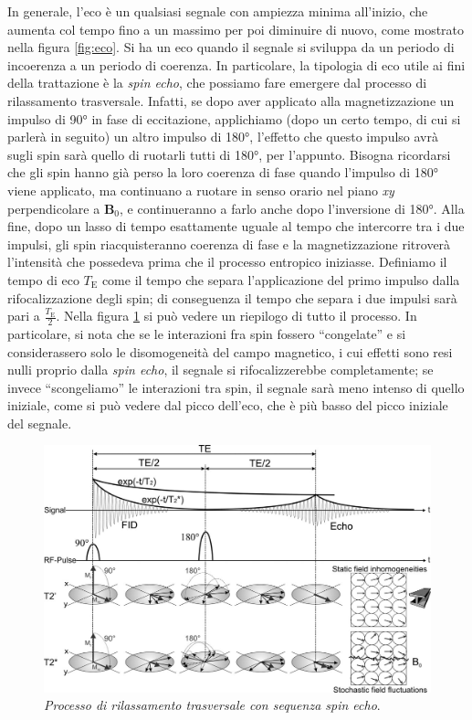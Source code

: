 \documentclass{report}
\newcommand{\virgolette}[1]{``#1''}
\newcommand{\figref}[1]{figura \ref{#1}}
\numberwithin{equation}{section}
\numberwithin{figure}{section}
\renewcommand{\Vec}{\bm}
\begin{document}
\noindent In generale, l'eco è un qualsiasi segnale con ampiezza minima all'inizio, che aumenta col tempo fino a un massimo per poi diminuire di nuovo, come mostrato nella \figref{fig:eco}. Si ha un eco quando il segnale si sviluppa da un periodo di incoerenza a un periodo di coerenza. In particolare, la tipologia di eco utile ai fini della trattazione è la \textit{spin echo}, che possiamo fare emergere dal processo di rilassamento trasversale. Infatti, se dopo aver applicato alla magnetizzazione un impulso di 90° in fase di eccitazione, applichiamo (dopo un certo tempo, di cui si parlerà in seguito) un altro impulso di 180°, l'effetto che questo impulso avrà sugli spin sarà quello di ruotarli tutti di 180°, per l'appunto. Bisogna ricordarsi che gli spin hanno già perso la loro coerenza di fase quando l'impulso di 180° viene applicato, ma continuano a ruotare in senso orario nel piano \textit{xy} perpendicolare a $\Vec{B}_0$, e continueranno a farlo anche dopo l'inversione di 180°. Alla fine, dopo un lasso di tempo esattamente uguale al tempo che intercorre tra i due impulsi, gli spin riacquisteranno coerenza di fase e la magnetizzazione ritroverà l'intensità che possedeva prima che il processo entropico iniziasse. Definiamo il tempo di eco $T_\mathrm{E}$ come il tempo che separa l'applicazione del primo impulso dalla rifocalizzazione degli spin; di conseguenza il tempo che separa i due impulsi sarà pari a $\frac{T_\mathrm{E}}{2}$. Nella \figref{fig:riepilogo} si può vedere un riepilogo di tutto il processo. In particolare, si nota che se le interazioni fra spin fossero \virgolette{congelate} e si considerassero solo le disomogeneità del campo magnetico, i cui effetti sono resi nulli proprio dalla \textit{spin echo}, il segnale si rifocalizzerebbe completamente; se invece \virgolette{scongeliamo} le interazioni tra spin, il segnale sarà meno intenso di quello iniziale, come si può vedere dal picco dell'eco, che è più basso del picco iniziale del segnale.

\begin{figure}[htp]
    \centering
    \includegraphics[scale=0.37]{immagini/riepilogo.jpg}
    \caption{\textit{Processo di rilassamento trasversale con sequenza spin echo}.}
    \label{fig:riepilogo}
\end{figure}
\end{document}
